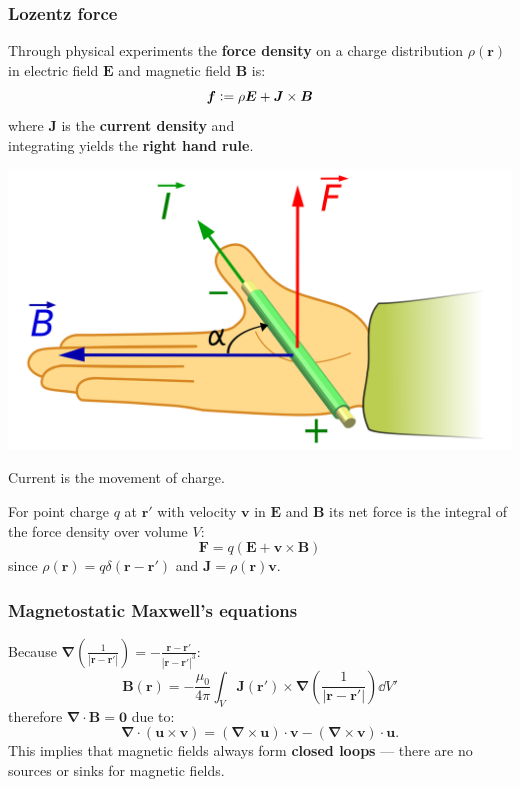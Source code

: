 \documentclass{article}
\newcommand{\deq}{\vcentcolon=}
\newcommand{\vc}[1]{\boldsymbol{#1}}
\begin{document}
\begin{multicols*}{3}
\newcolumn

\subsubsection*{Lozentz force}
Through physical experiments the \textbf{force density}
on a charge distribution $\rho(\vc{r})$
in electric field $\vc{E}$ and magnetic field $\vc{B}$ is:
$$\vc{f}\deq\rho\vc{E}+\vc{J}\times\vc{B}$$
where $\vc{J}$ is the \textbf{current density}
and \\ integrating yields the \textbf{right hand rule}.
\begin{center}
    \includegraphics[scale=0.05]{f07.png}
\end{center}
Current is the movement of charge.

For point charge $q$ at $\vc{r}'$ with velocity $\vc{v}$
in $\vc{E}$ and $\vc{B}$ its net force is the integral of the
force density over volume $V$:
$$\vc{F}=q(\vc{E}+\vc{v}\times\vc{B})$$
since $\rho(\vc{r})=q\delta(\vc{r}-\vc{r}')$
and $\vc{J}=\rho(\vc{r})\vc{v}$.

\subsubsection*{Magnetostatic Maxwell's equations}
Because $\displaystyle\vc{\nabla}\left(
\frac{1}{|\vc{r}-\vc{r}'|}\right)
=-\frac{\vc{r}-\vc{r}'}{|\vc{r}-\vc{r}'|^3}$:
$$\vc{B}(\vc{r})=-\frac{\mu_0}{4\pi}\int_V
\vc{J}(\vc{r}')\times\vc{\nabla}
\left(\frac{1}{|\vc{r}-\vc{r}'|}\right)\dd V'$$
therefore $\vc{\nabla}\cdot\vc{B}=\vc{0}$ due to:
$$\vc{\nabla}\cdot(\vc{u}\times\vc{v})
=(\vc{\nabla}\times\vc{u})\cdot\vc{v}
-(\vc{\nabla}\times\vc{v})\cdot\vc{u}.$$
This implies that magnetic fields always form
\textbf{closed loops} --- there are no sources
or sinks for magnetic fields.


\end{multicols*}
\end{document}
